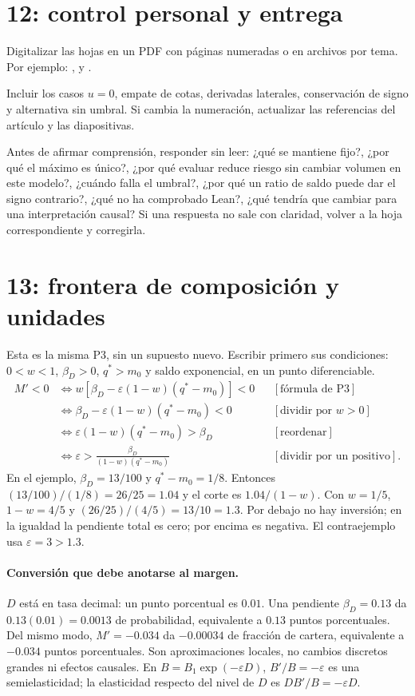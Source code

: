 \documentclass[11pt]{article}
\begin{document}
\section{12: control personal y entrega}
Digitalizar las hojas en un PDF con páginas numeradas o en archivos por tema.
Por ejemplo: ,  y
.

Incluir los casos $u=0$, empate de cotas, derivadas laterales, conservación
de signo y alternativa sin umbral. Si cambia la numeración, actualizar las
referencias del artículo y las diapositivas.

Antes de afirmar comprensión, responder sin leer: ¿qué se mantiene fijo?,
¿por qué el máximo es único?, ¿por qué evaluar reduce riesgo sin cambiar
volumen en este modelo?, ¿cuándo falla el umbral?, ¿por qué un ratio de saldo
puede dar el signo contrario?, ¿qué no ha comprobado Lean?, ¿qué tendría que
cambiar para una interpretación causal? Si una respuesta no sale con claridad,
volver a la hoja correspondiente y corregirla.
\section{13: frontera de composición y unidades}
Esta es la misma P3, sin un supuesto nuevo. Escribir primero sus condiciones:
$0<w<1$, $\beta_D>0$, $q^*>m_0$ y saldo exponencial, en un punto diferenciable.
\begin{align*}
M'<0
&\iff w[\beta_D-\varepsilon(1-w)(q^*-m_0)]<0
 &&[\text{fórmula de P3}]\\
&\iff\beta_D-\varepsilon(1-w)(q^*-m_0)<0
 &&[\text{dividir por }w>0]\\
&\iff\varepsilon(1-w)(q^*-m_0)>\beta_D
 &&[\text{reordenar}]\\
&\iff\varepsilon>\frac{\beta_D}{(1-w)(q^*-m_0)}
 &&[\text{dividir por un positivo}].
\end{align*}
En el ejemplo, $\beta_D=13/100$ y $q^*-m_0=1/8$. Entonces
$(13/100)/(1/8)=26/25=1.04$ y el corte es $1.04/(1-w)$.
Con $w=1/5$, $1-w=4/5$ y $(26/25)/(4/5)=13/10=1.3$.
Por debajo no hay inversión; en la igualdad la pendiente total es cero;
por encima es negativa. El contraejemplo usa $\varepsilon=3>1.3$.

\paragraph{Conversión que debe anotarse al margen.}
$D$ está en tasa decimal: un punto porcentual es $0.01$. Una pendiente
$\beta_D=0.13$ da $0.13(0.01)=0.0013$ de probabilidad, equivalente a
$0.13$ puntos porcentuales. Del mismo modo, $M'=-0.034$ da $-0.00034$
de fracción de cartera, equivalente a $-0.034$ puntos porcentuales.
Son aproximaciones locales, no cambios discretos grandes ni efectos causales.
En $B=B_1\exp(-\varepsilon D)$, $B'/B=-\varepsilon$ es una semielasticidad;
la elasticidad respecto del nivel de $D$ es $DB'/B=-\varepsilon D$.
\end{document}
